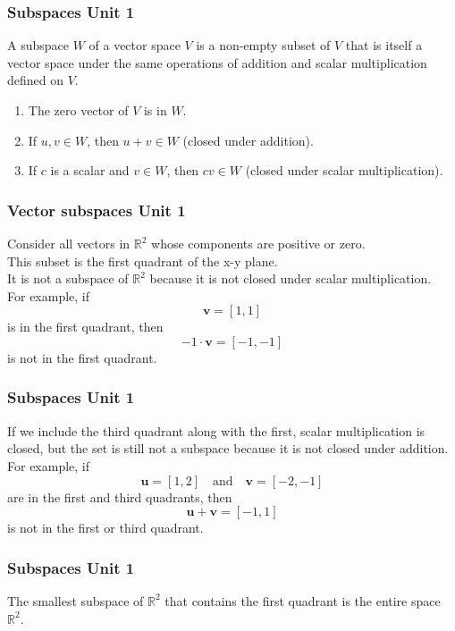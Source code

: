 \documentclass[12pt]{beamer}
\newcommand{\FrameTitle}[2]{\frametitle{#1 \hfill \small\textnormal{\textcolor{midgray}{#2}}}}
\newcommand{\snl}{\vspace*{8pt}\\}
\newcommand{\Vector}[1]{\textbf{#1}}
\begin{document}
\begin{frame}\FrameTitle{Subspaces}{Unit 1}
    \begin{definition}
        A subspace $W$ of a vector space $V$ is a non-empty subset of $V$
        that is itself a vector space under the same operations of addition
        and scalar multiplication defined on $V$.
    \end{definition}
    \begin{enumerate}
        \item The zero vector of $V$ is in $W$.
        \item If $u, v \in W$, then $u + v \in W$ (closed under addition).
        \item If $c$ is a scalar and $v \in W$, then $cv \in W$ (closed under scalar multiplication).
    \end{enumerate}
\end{frame}

\begin{frame}\FrameTitle{Vector subspaces}{Unit 1}
    Consider all vectors in $\mathbb{R}^2$ whose components are positive or zero. \snl
    This subset is the first quadrant of the x-y plane.\snl
    It is not a subspace of $\mathbb{R}^2$ because it is not closed under scalar multiplication.\snl
    For example, if
    $$
        \Vector{v} = [1, 1]
    $$
    is in the first quadrant,
    then
    $$
        -1 \cdot \Vector{v} = [-1, -1]
    $$
    is not in the first quadrant.
\end{frame}

\begin{frame}\FrameTitle{Subspaces}{Unit 1}
    If we include the third quadrant along with the first, scalar multiplication is closed,
    but the set is still not a subspace because it is not closed under addition. \snl

    For example, if
    $$
        \Vector{u} = [1, 2] \quad \text{and} \quad \Vector{v} = [-2, -1]
    $$
    are in the first and third quadrants, then
    $$
        \Vector{u} + \Vector{v} = [-1, 1]
    $$
    is not in the first or third quadrant.
\end{frame}

\begin{frame}\FrameTitle{Subspaces}{Unit 1}
    The smallest subspace of $\mathbb{R}^2$ that contains
    the first quadrant is the entire space $\mathbb{R}^2$.
\end{frame}
\end{document}
